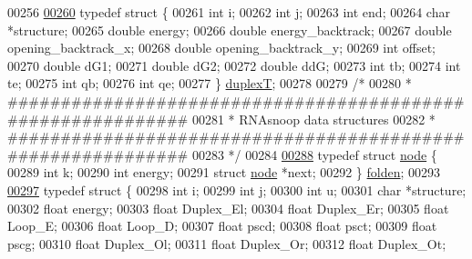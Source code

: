 \begin{DoxyCode}
00256 
\hypertarget{data__structures_8h_source.tex_l00260}{}\hyperlink{group__data__structures}{00260} \textcolor{keyword}{typedef} \textcolor{keyword}{struct }\{
00261   \textcolor{keywordtype}{int} i;
00262   \textcolor{keywordtype}{int} j;
00263   \textcolor{keywordtype}{int} end;
00264   \textcolor{keywordtype}{char} *structure;
00265   \textcolor{keywordtype}{double} energy;
00266   \textcolor{keywordtype}{double} energy\_backtrack;
00267   \textcolor{keywordtype}{double} opening\_backtrack\_x;
00268   \textcolor{keywordtype}{double} opening\_backtrack\_y;
00269   \textcolor{keywordtype}{int} offset;
00270   \textcolor{keywordtype}{double} dG1;
00271   \textcolor{keywordtype}{double} dG2;
00272   \textcolor{keywordtype}{double} ddG;
00273   \textcolor{keywordtype}{int} tb;
00274   \textcolor{keywordtype}{int} te;
00275   \textcolor{keywordtype}{int} qb;
00276   \textcolor{keywordtype}{int} qe;
00277 \} \hyperlink{group__data__structures_structduplexT}{duplexT};
00278 
00279 \textcolor{comment}{/*}
00280 \textcolor{comment}{* ############################################################}
00281 \textcolor{comment}{* RNAsnoop data structures}
00282 \textcolor{comment}{* ############################################################}
00283 \textcolor{comment}{*/}
00284 
\hypertarget{data__structures_8h_source.tex_l00288}{}\hyperlink{group__data__structures}{00288} \textcolor{keyword}{typedef} \textcolor{keyword}{struct }\hyperlink{group__data__structures_structnode}{node} \{
00289   \textcolor{keywordtype}{int} k;
00290   \textcolor{keywordtype}{int} energy;
00291   \textcolor{keyword}{struct }\hyperlink{group__data__structures_structnode}{node} *next;
00292 \} \hyperlink{group__data__structures_gaaf402058651c8218fa72788d591cda05}{folden};
00293 
\hypertarget{data__structures_8h_source.tex_l00297}{}\hyperlink{group__data__structures}{00297} \textcolor{keyword}{typedef} \textcolor{keyword}{struct }\{
00298   \textcolor{keywordtype}{int} i;
00299   \textcolor{keywordtype}{int} j;
00300   \textcolor{keywordtype}{int} u;
00301   \textcolor{keywordtype}{char} *structure;
00302   \textcolor{keywordtype}{float} energy;
00303   \textcolor{keywordtype}{float} Duplex\_El;
00304   \textcolor{keywordtype}{float} Duplex\_Er;
00305   \textcolor{keywordtype}{float} Loop\_E;
00306   \textcolor{keywordtype}{float} Loop\_D;
00307   \textcolor{keywordtype}{float} pscd;
00308   \textcolor{keywordtype}{float} psct;
00309   \textcolor{keywordtype}{float} pscg;
00310   \textcolor{keywordtype}{float} Duplex\_Ol;
00311   \textcolor{keywordtype}{float} Duplex\_Or;
00312   \textcolor{keywordtype}{float} Duplex\_Ot;

\end{DoxyCode}
